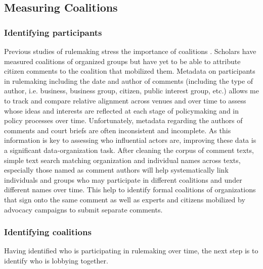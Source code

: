 
\subsection{Measuring Coalitions}

\subsubsection{Identifying participants}
Previous studies of rulemaking stress the importance of coalitions \citep{Yackee2006a}. Scholars have measured coalitions of organized groups but have yet to be able to attribute citizen comments to the coalition that mobilized them.
Metadata on participants in rulemaking including the date and author of comments (including the type of author, i.e. business, business group, citizen, public interest group, etc.)%
allows me to track and compare relative alignment  across venues and over time to assess whose ideas and interests are reflected at each stage of policymaking and in policy processes over time. %
Unfortunately, metadata regarding the authors of comments and court briefs are often inconsistent and incomplete. As this information is key to assessing who influential actors are, improving these data is a significant data-organization task. After cleaning the corpus of comment texts, simple text search matching organization and individual names across texts, especially those named as comment authors will help systematically link individuals and groups who may participate in different coalitions and under different names over time. This help to identify formal coalitions of organizations that sign onto the same comment as well as experts and citizens mobilized by advocacy campaigns to submit separate comments.

\subsubsection{Identifying coalitions }

Having identified who is participating in rulemaking over time, the next step is to identify who is lobbying together. 

